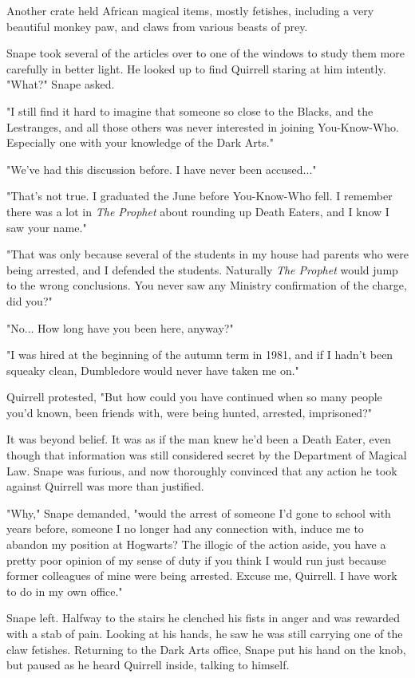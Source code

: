 Another crate held African magical items, mostly fetishes, including a very beautiful monkey paw, and claws from various beasts of prey.

Snape took several of the articles over to one of the windows to study them more carefully in better light. He looked up to find Quirrell staring at him intently. "What?" Snape asked.

"I still find it hard to imagine that someone so close to the Blacks, and the Lestranges, and all those others was never interested in joining You-Know-Who. Especially one with your knowledge of the Dark Arts."

"We've had this discussion before. I have never been accused..."

"That's not true. I graduated the June before You-Know-Who fell. I remember there was a lot in \emph{The Prophet} about rounding up Death Eaters, and I know I saw your name."

"That was only because several of the students in my house had parents who were being arrested, and I defended the students. Naturally \emph{The Prophet} would jump to the wrong conclusions. You never saw any Ministry confirmation of the charge, did you?"

"No... How long have you been here, anyway?"

"I was hired at the beginning of the autumn term in 1981, and if I hadn't been squeaky clean, Dumbledore would never have taken me on."

Quirrell protested, "But how could you have continued when so many people you'd known, been friends with, were being hunted, arrested, imprisoned?"

It was beyond belief. It was as if the man knew he'd been a Death Eater, even though that information was still considered secret by the Department of Magical Law. Snape was furious, and now thoroughly convinced that any action he took against Quirrell was more than justified.

"Why," Snape demanded, "would the arrest of someone I'd gone to school with years before, someone I no longer had any connection with, induce me to abandon my position at Hogwarts? The illogic of the action aside, you have a pretty poor opinion of my sense of duty if you think I would run just because former colleagues of mine were being arrested. Excuse me, Quirrell. I have work to do in my own office."

Snape left. Halfway to the stairs he clenched his fists in anger and was rewarded with a stab of pain. Looking at his hands, he saw he was still carrying one of the claw fetishes. Returning to the Dark Arts office, Snape put his hand on the knob, but paused as he heard Quirrell inside, talking to himself.

